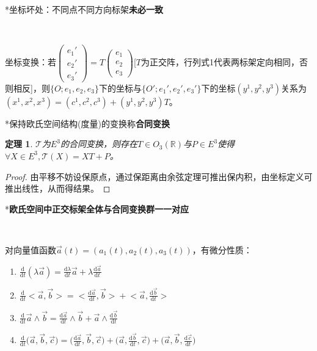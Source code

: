 \documentclass[a4paper,UTF8,fontset=windows]{ctexart}
\newtheorem{thm}{定理}[section]
\begin{document}
*坐标坏处：不同点不同方向标架\textbf{未必一致}

\

坐标变换：若$\begin{pmatrix}e_1'\\e_2'\\e_3'\end{pmatrix}=T\begin{pmatrix}e_1\\e_2\\e_3\end{pmatrix}$[$T$为正交阵，行列式1代表两标架定向相同，否则相反]，则$\{O;e_1,e_2,e_3\}$下的坐标与$\{O';e_1',e_2',e_3'\}$下的坐标$(y^1,y^2,y^3)$关系为$(x^1,x^2,x^3)=(c^1,c^2,c^3)+(y^1,y^2,y^3)T$。

*保持欧氏空间结构(度量)的变换称\textbf{合同变换}

\begin{thm}
$\mathcal{T}$为$E^3$的合同变换，则存在$T\in O_3(\mathbb{R})$与$P\in E^3$使得$\forall X\in E^3,\mathcal{T}(X)=XT+P$。
\end{thm}

\begin{proof}
由平移不妨设保原点，通过保距离由余弦定理可推出保内积，由坐标定义可推出线性，从而得结果。
\end{proof}

*\textbf{欧氏空间中正交标架全体与合同变换群一一对应}

\

对向量值函数$\vec{a}(t)=(a_1(t),a_2(t),a_3(t))$，有微分性质：

\begin{enumerate}
    \item $\frac{\mathrm{d}}{\mathrm{d}t}(\lambda\vec{a})=\frac{\mathrm{d}\lambda}{\mathrm{d}t}\vec{a}+\lambda\frac{\mathrm{d}\vec{a}}{\mathrm{d}t}$
    \item $\frac{\mathrm{d}}{\mathrm{d}t}\big<\vec{a},\vec{b}\big>=\big<\frac{\mathrm{d}\vec{a}}{\mathrm{d}t},\vec{b}\big>+\big<\vec{a},\frac{\mathrm{d}\vec{b}}{\mathrm{d}t}\big>$
    \item $\frac{\mathrm{d}}{\mathrm{d}t}\vec{a}\wedge\vec{b}=\frac{\mathrm{d}\vec{a}}{\mathrm{d}t}\wedge\vec{b}+\vec{a}\wedge\frac{\mathrm{d}\vec{b}}{\mathrm{d}t}$
    \item $\frac{\mathrm{d}}{\mathrm{d}t}\big(\vec{a},\vec{b},\vec{c}\big)=\big(\frac{\mathrm{d}\vec{a}}{\mathrm{d}t},\vec{b},\vec{c}\big)+\big(\vec{a},\frac{\mathrm{d}\vec{b}}{\mathrm{d}t},\vec{c}\big)+\big(\vec{a},\vec{b},\frac{\mathrm{d}\vec{c}}{\mathrm{d}t}\big)$
\end{enumerate}
\end{document}
